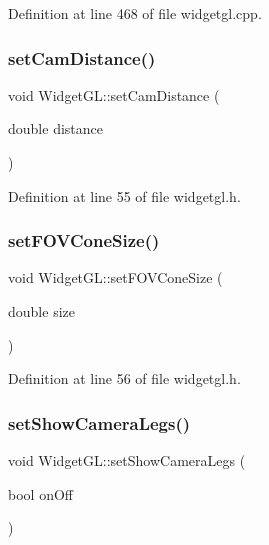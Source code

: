 Definition at line 468 of file widgetgl.\+cpp.

\mbox{\label{class_widget_g_l_abcd3b5221ed597605d4ccc5988e48b22}} 
\subsubsection{\texorpdfstring{setCamDistance()}{setCamDistance()}}
{\footnotesize\ttfamily void Widget\+G\+L\+::set\+Cam\+Distance (\begin{DoxyParamCaption}\item[{double}]{distance }\end{DoxyParamCaption})\hspace{0.3cm}{\ttfamily [inline]}}



Definition at line 55 of file widgetgl.\+h.

\mbox{\label{class_widget_g_l_a458a6543d761ca1cdd71e471aa1b5d58}} 
\subsubsection{\texorpdfstring{setFOVConeSize()}{setFOVConeSize()}}
{\footnotesize\ttfamily void Widget\+G\+L\+::set\+F\+O\+V\+Cone\+Size (\begin{DoxyParamCaption}\item[{double}]{size }\end{DoxyParamCaption})\hspace{0.3cm}{\ttfamily [inline]}}



Definition at line 56 of file widgetgl.\+h.

\mbox{\label{class_widget_g_l_a8fdfad70a72bdabdc84aff3007bd3129}} 
\subsubsection{\texorpdfstring{setShowCameraLegs()}{setShowCameraLegs()}}
{\footnotesize\ttfamily void Widget\+G\+L\+::set\+Show\+Camera\+Legs (\begin{DoxyParamCaption}\item[{bool}]{on\+Off }\end{DoxyParamCaption})\hspace{0.3cm}{\ttfamily [inline]}}



